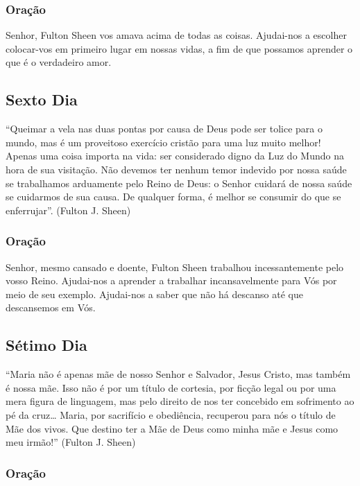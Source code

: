 \documentclass[11pt]{article}
\begin{document}
\subsubsection{Oração}

Senhor, Fulton Sheen vos amava acima de todas as coisas. Ajudai-nos a escolher colocar-vos em primeiro lugar em nossas vidas, a fim de que possamos aprender o que é o verdadeiro amor.

\textbf{}

\subsection{Sexto Dia}

“Queimar a vela nas duas pontas por causa de Deus pode ser tolice para o mundo, mas é um proveitoso exercício cristão para uma luz muito melhor! Apenas uma coisa importa na vida: ser considerado digno da Luz do Mundo na hora de sua visitação. Não devemos ter nenhum temor indevido por nossa saúde se trabalhamos arduamente pelo Reino de Deus: o Senhor cuidará de nossa saúde se cuidarmos de sua causa. De qualquer forma, é melhor se consumir do que se enferrujar”. (Fulton J. Sheen)

\subsubsection{Oração}

Senhor, mesmo cansado e doente, Fulton Sheen trabalhou incessantemente pelo vosso Reino. Ajudai-nos a aprender a trabalhar incansavelmente para Vós por meio de seu exemplo. Ajudai-nos a saber que não há descanso até que descansemos em Vós.

\textbf{}


\subsection{Sétimo Dia}

“Maria não é apenas mãe de nosso Senhor e Salvador, Jesus Cristo, mas também é nossa mãe. Isso não é por um título de cortesia, por ficção legal ou por uma mera figura de linguagem, mas pelo direito de nos ter concebido em sofrimento ao pé da cruz… Maria, por sacrifício e obediência, recuperou para nós o título de Mãe dos vivos. Que destino ter a Mãe de Deus como minha mãe e Jesus como meu irmão!” (Fulton J. Sheen)

\subsubsection{Oração}
\end{document}
